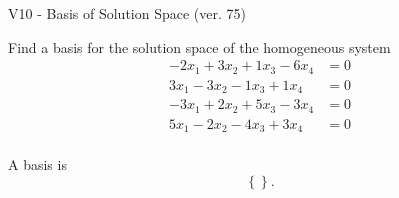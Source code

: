 \begin{exercise}
  \begin{exerciseTitle}V10 - Basis of Solution Space (ver. 75)\end{exerciseTitle}
  \begin{exerciseStatement}
    Find a basis for the solution space of the homogeneous system 
\begin{align*}
 -2 x_ 1 + 3 x_ 2 + 1 x_ 3 -6 x_ 4 &= 0  \\ 
  3 x_ 1 -3 x_ 2 -1 x_ 3 + 1 x_ 4 &= 0  \\ 
  -3 x_ 1 + 2 x_ 2 + 5 x_ 3 -3 x_ 4 &= 0  \\ 
  5 x_ 1 -2 x_ 2 -4 x_ 3 + 3 x_ 4 &= 0  \\ 
 \end{align*}


 
  \end{exerciseStatement}

  \begin{exerciseAnswer}
   A basis is   
\[\left\{\right\}.\]

  


  \end{exerciseAnswer}
\end{exercise}